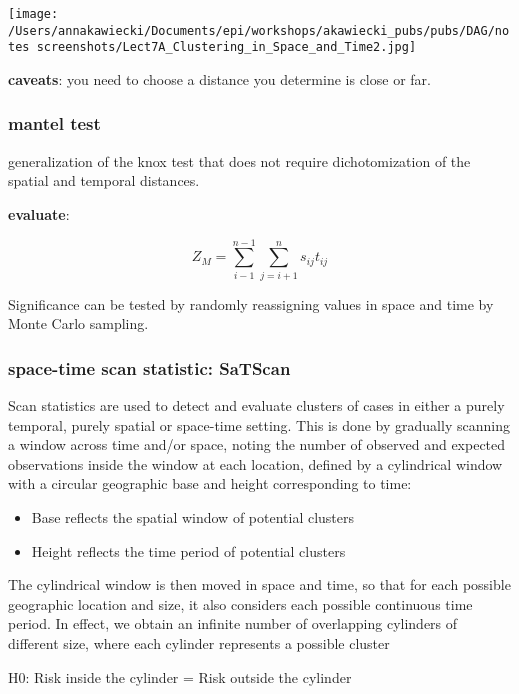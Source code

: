\documentclass[
]{article}
\begin{document}
\texttt{[image: /Users/annakawiecki/Documents/epi/workshops/akawiecki\_pubs/pubs/DAG/notes screenshots/Lect7A\_Clustering\_in\_Space\_and\_Time2.jpg]}

\textbf{caveats}: you need to choose a distance you determine is close
or far.

\hypertarget{mantel-test}{%
\subsubsection{mantel test}\label{mantel-test}}

generalization of the knox test that does not require dichotomization of
the spatial and temporal distances.

\textbf{evaluate}:

\[Z_M = \sum_{i-1}^{n-1}\sum_{j=i+1}^{n}s_{ij}t_{ij}\]

Significance can be tested by randomly reassigning values in space and
time by Monte Carlo sampling.

\hypertarget{space-time-scan-statistic-satscan}{%
\subsubsection{space-time scan statistic:
SaTScan}\label{space-time-scan-statistic-satscan}}

Scan statistics are used to detect and evaluate clusters of cases in
either a purely temporal, purely spatial or space-time setting. This is
done by gradually scanning a window across time and/or space, noting the
number of observed and expected observations inside the window at each
location, defined by a cylindrical window with a circular geographic
base and height corresponding to time:

\begin{itemize}
\item
  Base reflects the spatial window of potential clusters
\item
  Height reflects the time period of potential clusters
\end{itemize}

The cylindrical window is then moved in space and time, so that for each
possible geographic location and size, it also considers each possible
continuous time period. In effect, we obtain an infinite number of
overlapping cylinders of different size, where each cylinder represents
a possible cluster

H0: Risk inside the cylinder = Risk outside the cylinder
\end{document}
